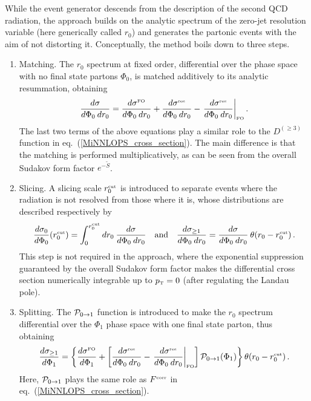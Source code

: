 \documentclass[11pt,a4paper]{article}
\begin{document}
While the \minnlo{} event generator descends from the \POWHEG{}
description of the second QCD radiation, the \GENEVA{} approach
\cite{Alioli:2015toa, Gavardi:2023aco} builds on the analytic spectrum
of the zero-jet resolution variable (here generically called $r_0$)
and generates the partonic events with the aim of not distorting
it. Conceptually, the \GENEVA{} method boils down to three steps.
\begin{enumerate}
\item Matching. The $r_0$ spectrum at fixed order, differential over
  the phase space with no final state partons $\Phi_0$, is matched
  additively to its analytic resummation, obtaining
  \begin{equation}
    \frac{d\sigma}{d\Phi_0 \> dr_0} =
    \frac{d\sigma^{\scriptscriptstyle\rm FO}}{d\Phi_0 \> dr_0} +
    \frac{d\sigma^{\scriptscriptstyle\rm res}}{d\Phi_0 \> dr_0} -
    \left. \frac{d\sigma^{\scriptscriptstyle\rm res}}{d\Phi_0 \>
      dr_0}\right|_{\scriptscriptstyle\rm FO}.
  \end{equation}
  The last two terms of the above equations play a similar role to the
  $D^{(\geq 3)}$ function in eq.~(\ref{MiNNLOPS_cross_section}). The
  main difference is that the \minnlo{} matching is performed
  multiplicatively, as can be seen from the overall Sudakov form
  factor $e^{-\tilde{S}}$.
\item Slicing. A slicing scale $r_0^{\scriptscriptstyle\rm cut}$ is
  introduced to separate events where the radiation is not resolved
  from those where it is, whose distributions are described
  respectively by
  \begin{equation}
    \frac{d\sigma_0}{d\Phi_0}\!\left(r_0^{\scriptscriptstyle\rm
      cut}\right) = \int_0^{r_0^{\scriptscriptstyle\rm cut}} dr_0 \>
    \frac{d\sigma}{d\Phi_0 \> dr_0}
    \quad \mbox{and} \quad
    \frac{d\sigma_{\geq 1}}{d\Phi_0 \> dr_0} = \frac{d\sigma}{d\Phi_0
      \> dr_0} \> \theta\!\left(r_0 - r_0^{\scriptscriptstyle\rm
      cut}\right).
  \end{equation}
  This step is not required in the \minnlo{} approach, where the
  exponential suppression guaranteed by the overall Sudakov form
  factor makes the differential cross section numerically integrable
  up to $p_{\scriptscriptstyle\rm T} = 0$ (after regulating the Landau
  pole).
\item Splitting. The ${\cal P}_{0 \to 1}$ function is introduced to
  make the $r_0$ spectrum differential over the $\Phi_1$ phase space
  with one final state parton, thus obtaining
  \begin{equation}
    \frac{d\sigma_{\geq 1}}{d\Phi_1} =
    \left\{\frac{d\sigma^{\scriptscriptstyle\rm FO}}{d\Phi_1} +
    \left[\frac{d\sigma^{\scriptscriptstyle\rm res}}{d\Phi_0 \> dr_0}
      - \left. \frac{d\sigma^{\scriptscriptstyle\rm res}}{d\Phi_0 \>
        dr_0}\right|_{\scriptscriptstyle\rm FO} \right] {\cal P}_{0
      \to 1}\!\left(\Phi_1\right)\right\} \theta\!\left(r_0 -
    r_0^{\scriptscriptstyle\rm cut}\right).
  \end{equation}
  Here, ${\cal P}_{0 \to 1}$ plays the same role as
  $F^{\scriptscriptstyle\rm corr}$ in
  eq.~(\ref{MiNNLOPS_cross_section}).
\end{enumerate}
\end{document}
